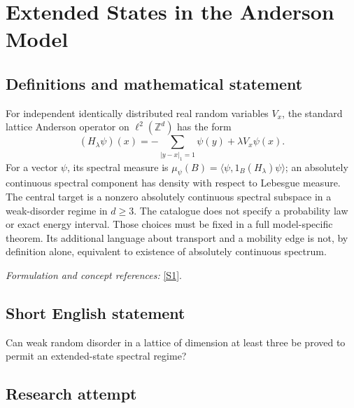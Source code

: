 \documentclass[11pt,a4paper]{article}
\newcommand{\Z}{\mathbb{Z}}
\newcommand{\sref}[2]{\hyperlink{source:#1:#2}{[S#2]}}
\newif\ifshowcatalogue
\newcommand{\cataloguescope}[1]{\ifshowcatalogue
 \paragraph{Exact scope in the supplied catalogue.}
 \begin{quote}\small #1\end{quote}\fi}
\numberwithin{equation}{section}
\begin{document}
\setcounter{section}{0}
\clearpage
\section*{\texorpdfstring{Extended States in the Anderson Model}{Extended States in the Anderson Model}}\label{statement}
\subsection{Definitions and mathematical statement}
For independent identically distributed real random variables $V_x$, the standard lattice Anderson operator on $\ell^2(\Z^d)$ has the form
\[
 (H_\lambda\psi)(x)=-\sum_{|y-x|_1=1}\psi(y)+\lambda V_x\psi(x).
\]
For a vector $\psi$, its spectral measure is $\mu_\psi(B)=\langle\psi,1_B(H_\lambda)\psi\rangle$; an absolutely continuous spectral component has density with respect to Lebesgue measure. The central target is a nonzero absolutely continuous spectral subspace in a weak-disorder regime in $d\ge3$. The catalogue does not specify a probability law or exact energy interval. Those choices must be fixed in a full model-specific theorem. Its additional language about transport and a mobility edge is not, by definition alone, equivalent to existence of absolutely continuous spectrum.
\par\smallskip\textit{Formulation and concept references:} \sref{statement}{1}.
\cataloguescope{Prove that the Anderson model, the discrete random Schroedinger operator on Z\textasciicircum{}d with d >= 3, has a regime of absolutely continuous spectrum, equivalently that a conducting phase and a mobility edge exist at weak disorder, so that the metal-insulator transition is established.}
\subsection{Short English statement}
Can weak random disorder in a lattice of dimension at least three be proved to permit an extended-state spectral regime?
\subsection{Research attempt}
\end{document}

